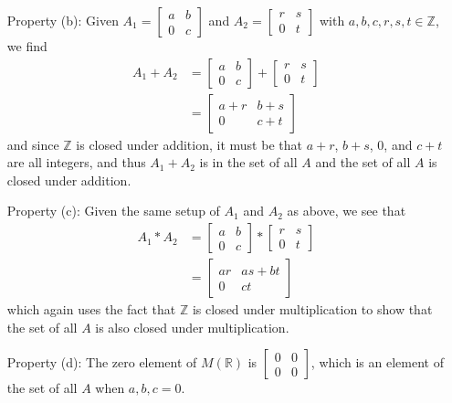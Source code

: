 \documentclass{article}
\begin{document}
\begin{enumerate}
\begin{enumerate}
				\item [Property (b):] Given $A_1 = \begin{bmatrix} a & b \\ 0 & c \end{bmatrix}$ and 
					$A_2 = \begin{bmatrix} r & s \\ 0 & t \end{bmatrix}$ with $a, b, c, r, s, t \in
					\mathbb{Z}$, we find
					\begin{align*}
						A_1 + A_2 & = \begin{bmatrix} a & b \\ 0 & c \end{bmatrix} 
									+ \begin{bmatrix} r & s \\ 0 & t \end{bmatrix} \\
								  & = \begin{bmatrix} a + r & b + s \\ 0 & c + t \end{bmatrix} 
					\end{align*}
					and since $\mathbb{Z}$ is closed under addition, it must be that $a + r$, 
					$b + s$, $0$, and $c + t$ are all integers, and thus $A_1 + A_2$ is in the 
					set of all $A$ and the set of all $A$ is closed under addition. 

				\item [Property (c):] Given the same setup of $A_1$ and $A_2$ as above, we see that
					\begin{align*}
						A_1 * A_2 & = \begin{bmatrix} a & b \\ 0 & c \end{bmatrix} 
									* \begin{bmatrix} r & s \\ 0 & t \end{bmatrix} \\
								  & = \begin{bmatrix} ar & as + bt \\ 0 & ct \end{bmatrix} 
					\end{align*}
					which again uses the fact that $\mathbb{Z}$ is closed under multiplication to 
					show that the set of all $A$ is also closed under multiplication.

				\item [Property (d):] The zero element of $M(\mathbb{R})$ is 
					$\begin{bmatrix}0 & 0 \\ 0 & 0 \end{bmatrix}$, which is an element of the set of
					all $A$ when $a, b, c = 0$. 


\end{enumerate}
\end{enumerate}
\end{document}
